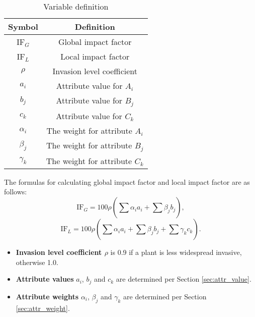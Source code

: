 \documentclass[12pt]{article}
\begin{document}
		{
			\fontsize{10}{14}\selectfont
			{
				\begin{longtable}{cc}
					
					\caption{Variable definition}
					\label{tb:syms}\\
					\toprule
					Symbol&Definition\\
					\toprule
					IF$_G$&Global impact factor\\
					IF$_L$&Local impact factor\\
					$\rho$&Invasion level coefficient\\
					$a_i$&Attribute value for $A_i$\\
					$b_j$&Attribute value for $B_j$\\
					$c_k$&Attribute value for $C_k$\\
					$\alpha_i$&The weight for attribute $A_i$\\
					$\beta_j$&The weight for attribute $B_j$\\
					$\gamma_k$&The weight for attribute $C_k$\\
					\bottomrule
					
				\end{longtable}
			}
		}
		The formulas for calculating global impact factor and local impact factor are as follows:
		\begin{equation} \label{eq:ifg}
			\mathrm{IF}_G = 100\rho \left( \sum_{} \alpha_ia_i + \sum_{} \beta_jb_j \right),
		\end{equation} 
		\begin{equation} \label{eq:ifl}
			\mathrm{IF}_L = 100\rho \left( \sum_{} \alpha_ia_i + \sum_{} \beta_jb_j + \sum_{} \gamma_kc_k \right).
		\end{equation}
		
		{
		
		\begin{itemize}
		\vspace{-0.2cm}
		\item \textbf{Invasion level coefficient $\rho$} is 0.9 if a plant is less widespread invasive, otherwise 1.0.
		\vspace{-0.2cm}
		\item \textbf{Attribute values} $a_i$, $b_j$ and $c_k$ are determined per Section \ref{sec:attr_value}.
		\vspace{-0.2cm}
		\item \textbf{Attribute weights} $\alpha_i$, $\beta_j$ and $\gamma_k$ are determined per Section \ref{sec:attr_weight}.
		\end{itemize}
		}
	
\end{document}

